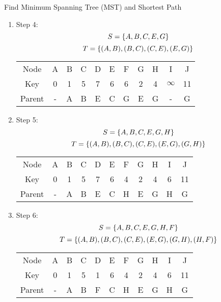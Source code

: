 \documentclass{article}
\numberwithin{table}{section}
\numberwithin{figure}{section}
\begin{document}
\begin{section}{Find Minimum Spanning Tree (MST) and Shortest Path}
\begin{enumerate}[(A)]
\begin{enumerate}[(a)]
\begin{tcolorbox}[breakable]
\begin{enumerate}[(1)]
            \item Step 4:
            $$S = \left\{A, B, C, E, G\right\}$$
            $$T = \left\{(A, B), (B, C), (C, E), (E, G)\right\}$$
            \begin{table}[H]
                \centering
                \begin{tabular}{c|cccccccccc}
                    \hline
                    Node & A & B & C & D & E & F & G & H & I & J \\
                    Key & 0 & 1 & 5 & 7 & 6 & 6 & 2 & 4 & $\infty$ & 11 \\
                    Parent & - & A & B & E & C & G & E & G & - & G \\
                    \hline
                \end{tabular}
            \end{table}
        

            \item Step 5:
            $$S = \left\{A, B, C, E, G, H\right\}$$
            $$T = \left\{(A, B), (B, C), (C, E), (E, G), (G, H)\right\}$$
            \begin{table}[H]
                \centering
                \begin{tabular}{c|cccccccccc}
                    \hline
                    Node & A & B & C & D & E & F & G & H & I & J \\
                    Key & 0 & 1 & 5 & 7 & 6 & 4 & 2 & 4 & 6 & 11 \\
                    Parent & - & A & B & E & C & H & E & G & H & G \\
                    \hline
                \end{tabular}
            \end{table}
        

            \item Step 6:
            $$S = \left\{A, B, C, E, G, H, F\right\}$$
            $$T = \left\{(A, B), (B, C), (C, E), (E, G), (G, H), (H, F)\right\}$$
            \begin{table}[H]
                \centering
                \begin{tabular}{c|cccccccccc}
                    \hline
                    Node & A & B & C & D & E & F & G & H & I & J \\
                    Key & 0 & 1 & 5 & 1 & 6 & 4 & 2 & 4 & 6 & 11 \\
                    Parent & - & A & B & F & C & H & E & G & H & G \\
                    \hline
                \end{tabular}
            \end{table}
        


\end{enumerate}
\end{tcolorbox}
\end{enumerate}
\end{enumerate}
\end{section}
\end{document}
